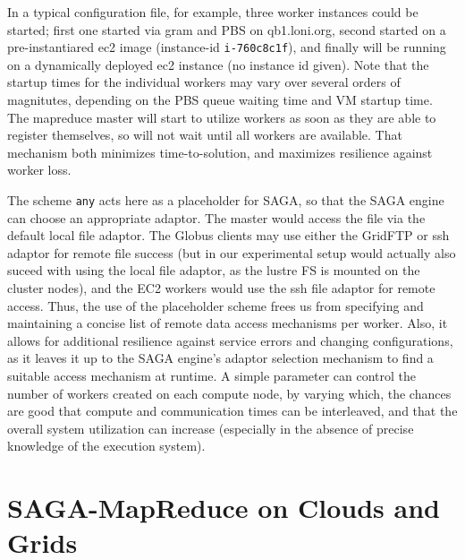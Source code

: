 \documentclass[conference,final]{IEEEtran}
\newcommand{\T}[1]{\texttt{#1}}
\begin{document}
  

In a typical configuration file, for example, three worker instances
could be started; first one started via gram and PBS on qb1.loni.org,
second started on a pre-instantiared ec2 image (instance-id
\T{i-760c8c1f}), and finally will be running on a dynamically deployed
ec2 instance (no instance id given).  Note that the startup times for
the individual workers may vary over several orders of magnitutes,
depending on the PBS queue waiting time and VM startup time.  The
mapreduce master will start to utilize workers as soon as they are
able to register themselves, so will not wait until all workers are
available.  That mechanism both minimizes time-to-solution, and
maximizes resilience against worker loss.

The scheme \T{any} acts here as a placeholder for SAGA, so that the
SAGA engine can choose an appropriate adaptor.  The master would
access the file via the default local file adaptor.  The Globus
clients may use either the GridFTP or ssh adaptor for remote file
success (but in our experimental setup would actually also suceed with
using the local file adaptor, as the lustre FS is mounted on the
cluster nodes), and the EC2 workers would use the ssh file adaptor for
remote access.  Thus, the use of the placeholder scheme frees us from
specifying and maintaining a concise list of remote data access
mechanisms per worker.  Also, it allows for additional resilience
against service errors and changing configurations, as it leaves it up
to the SAGA engine's adaptor selection mechanism to find a suitable
access mechanism at runtime.
A simple parameter can control the number of workers created on each
compute node, by varying which, the chances are good that compute and
communication times can be interleaved, and that the overall system
utilization can increase (especially in the absence of precise
knowledge of the execution system).
 
\section{SAGA-MapReduce on Clouds and Grids}
\end{document}
